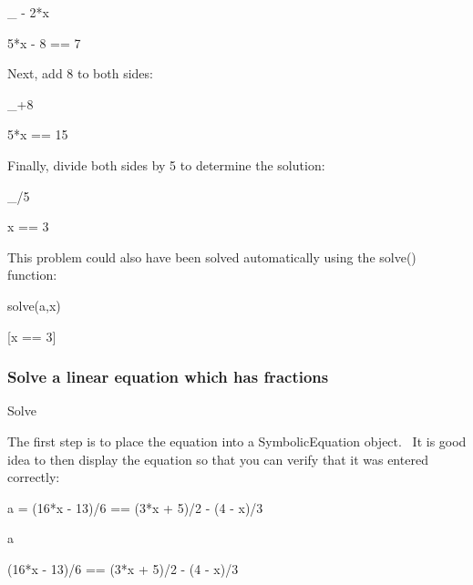 \documentclass[12pt,twoside]{book}
\begin{document}
{\textquotedbl}{\textquotedbl}{\textquotedbl}

\_ {}- 2*x

{\textbar}

5*x {}- 8 == 7

{\textquotedbl}{\textquotedbl}{\textquotedbl}

Next, add 8 to both sides:

{\textquotedbl}{\textquotedbl}{\textquotedbl}

\_+8

{\textbar}

5*x == 15

{\textquotedbl}{\textquotedbl}{\textquotedbl}

Finally, divide both sides by 5 to determine the solution:

{\textquotedbl}{\textquotedbl}{\textquotedbl}

\_/5

{\textbar}

x == 3

{\textquotedbl}{\textquotedbl}{\textquotedbl}

This problem could also have been solved automatically using the solve() function:

{\textquotedbl}{\textquotedbl}{\textquotedbl}

solve(a,x)

{\textbar}

[x == 3]

\subsubsection[Solve a linear equation which has fractions]{Solve a linear equation which has fractions}

Solve 


\bigskip

{\textquotedbl}{\textquotedbl}{\textquotedbl}

The first step is to place the equation into a SymbolicEquation object. \ It is good idea to then display the equation so that you can verify that it was entered correctly:

{\textquotedbl}{\textquotedbl}{\textquotedbl}

a = (16*x {}- 13)/6 == (3*x + 5)/2 {}- (4 {}- x)/3

a

{\textbar}

(16*x {}- 13)/6 == (3*x + 5)/2 {}- (4 {}- x)/3


\bigskip
\end{document}
